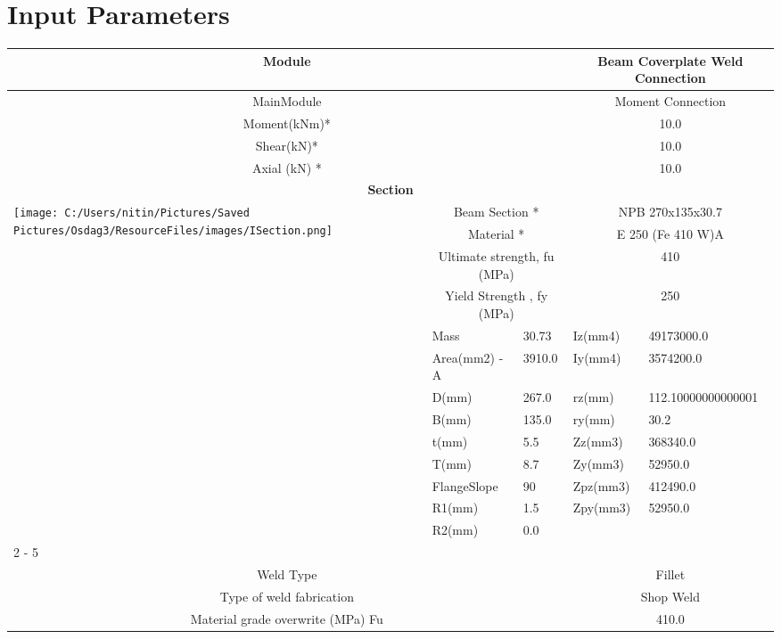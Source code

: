 \documentclass{article}%
\begin{document}
%
\normalsize%
\pagestyle{header}%
\section{Input Parameters}%
\label{sec:InputParameters}%
\renewcommand{\arraystretch}{1.2}%
\begin{longtable}{|p{5cm}|p{2cm}|p{2cm}|p{2cm}|p{5cm}|}%
\hline%
\hline%
\multicolumn{3}{|c|}{Module}&\multicolumn{2}{|c|}{Beam Coverplate  Weld Connection}\\%
\hline%
\hline%
\multicolumn{3}{|c|}{MainModule}&\multicolumn{2}{|c|}{Moment Connection}\\%
\hline%
\hline%
\multicolumn{3}{|c|}{Moment(kNm)*}&\multicolumn{2}{|c|}{10.0}\\%
\hline%
\hline%
\multicolumn{3}{|c|}{Shear(kN)*}&\multicolumn{2}{|c|}{10.0}\\%
\hline%
\hline%
\multicolumn{3}{|c|}{Axial (kN) *}&\multicolumn{2}{|c|}{10.0}\\%
\hline%
\hline%
\multicolumn{5}{|c|}{\textbf{Section}}\\%
\hline%
\hline%
\multirow{13}{*}{\texttt{[image: C:/Users/nitin/Pictures/Saved Pictures/Osdag3/ResourceFiles/images/ISection.png]}}&\multicolumn{2}{|c|}{Beam Section *}&\multicolumn{2}{|c|}{NPB 270x135x30.7}\\%
\cline{2%
-%
5}%
&\multicolumn{2}{|c|}{Material *}&\multicolumn{2}{|c|}{E 250 (Fe 410 W)A}\\%
\cline{2%
-%
5}%
&\multicolumn{2}{|c|}{Ultimate strength, fu (MPa)}&\multicolumn{2}{|c|}{410}\\%
\cline{2%
-%
5}%
&\multicolumn{2}{|c|}{Yield Strength , fy (MPa)}&\multicolumn{2}{|c|}{250}\\%
\cline{2%
-%
5}%
&Mass&30.73&Iz(mm4)&49173000.0\\%
\cline{2%
-%
5}%
&Area(mm2) {-} A&3910.0&Iy(mm4)&3574200.0\\%
\cline{2%
-%
5}%
&D(mm)&267.0&rz(mm)&112.10000000000001\\%
\cline{2%
-%
5}%
&B(mm)&135.0&ry(mm)&30.2\\%
\cline{2%
-%
5}%
&t(mm)&5.5&Zz(mm3)&368340.0\\%
\cline{2%
-%
5}%
&T(mm)&8.7&Zy(mm3)&52950.0\\%
\cline{2%
-%
5}%
&FlangeSlope&90&Zpz(mm3)&412490.0\\%
\cline{2%
-%
5}%
&R1(mm)&1.5&Zpy(mm3)&52950.0\\%
\cline{2%
-%
5}%
&R2(mm)&0.0&&\\%
\cline{2%
-%
5}%
\hline%
\multicolumn{5}{|c|}{\textbf{Weld Details}}\\%
\hline%
\hline%
\multicolumn{3}{|c|}{Weld Type}&\multicolumn{2}{|c|}{Fillet}\\%
\hline%
\hline%
\multicolumn{3}{|c|}{Type of weld fabrication}&\multicolumn{2}{|c|}{Shop Weld}\\%
\hline%
\hline%
\multicolumn{3}{|c|}{Material grade overwrite (MPa) Fu}&\multicolumn{2}{|c|}{410.0}\\%
\hline%
\end{longtable}
\end{document}
